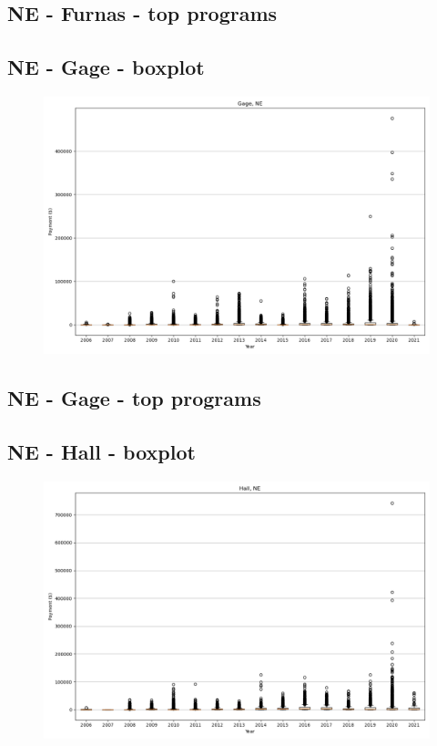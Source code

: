 \subsection*{NE - Furnas - top programs}

\newpage
\subsection*{NE - Gage - boxplot}
\begin{figure}[h]
\centering
\includegraphics[width=7in]{../output/boxplots/counties/Gage-NE_boxplot.png}
\end{figure}


\subsection*{NE - Gage - top programs}

\newpage
\subsection*{NE - Hall - boxplot}
\begin{figure}[h]
\centering
\includegraphics[width=7in]{../output/boxplots/counties/Hall-NE_boxplot.png}
\end{figure}


